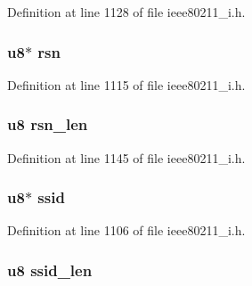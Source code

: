 Definition at line 1128 of file ieee80211\-\_\-i.\-h.

\hypertarget{structieee802__11__elems_a052b78ba85219ace0375b4ced0902a0c}{
\subsubsection[{rsn}]{\setlength{\rightskip}{0pt plus 5cm}u8$\ast$ rsn}}\label{structieee802__11__elems_a052b78ba85219ace0375b4ced0902a0c}


Definition at line 1115 of file ieee80211\-\_\-i.\-h.

\hypertarget{structieee802__11__elems_af457de8cfed4f313c6a1e8154ce440f6}{
\subsubsection[{rsn\-\_\-len}]{\setlength{\rightskip}{0pt plus 5cm}u8 rsn\-\_\-len}}\label{structieee802__11__elems_af457de8cfed4f313c6a1e8154ce440f6}


Definition at line 1145 of file ieee80211\-\_\-i.\-h.

\hypertarget{structieee802__11__elems_a2b1a755b5ea91fcd084b731e52d74baa}{
\subsubsection[{ssid}]{\setlength{\rightskip}{0pt plus 5cm}u8$\ast$ ssid}}\label{structieee802__11__elems_a2b1a755b5ea91fcd084b731e52d74baa}


Definition at line 1106 of file ieee80211\-\_\-i.\-h.

\hypertarget{structieee802__11__elems_a440f44724caffefa0f9c838518a3c790}{
\subsubsection[{ssid\-\_\-len}]{\setlength{\rightskip}{0pt plus 5cm}u8 ssid\-\_\-len}}\label{structieee802__11__elems_a440f44724caffefa0f9c838518a3c790}



